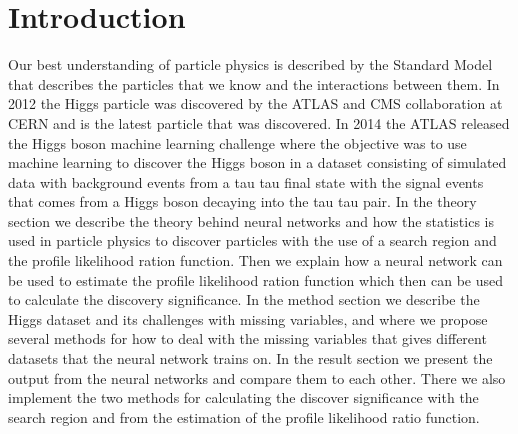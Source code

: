 \documentclass[../../main/main.tex]{subfiles}
\begin{document}
\section{Introduction} 

Our best understanding of particle physics is described by the Standard Model that describes the particles that we know and the interactions between them. In 2012 the Higgs particle was discovered by the ATLAS and CMS collaboration at CERN and is the latest particle that was discovered. In 2014 the ATLAS released the Higgs boson machine learning challenge where the objective was to use machine learning to discover the Higgs boson in a dataset consisting of simulated data with background events from a tau tau final state with the signal events that comes from a Higgs boson decaying into the tau tau pair.
In the theory section we describe the theory behind neural networks and how the statistics is used in particle physics to discover particles with the use of a search region and the profile likelihood ration function. Then we explain how a neural network can be used to estimate the profile likelihood ration function which then can be used to calculate the discovery significance. In the method section we describe the Higgs dataset and its challenges with missing variables, and where we propose several methods for how to deal with the missing variables that gives different datasets that the neural network trains on. In the result section we present the output from the neural networks and compare them to each other. There we also implement the two methods for calculating the discover significance with the search region and from the estimation of the profile likelihood ratio function.

 
\end{document}
